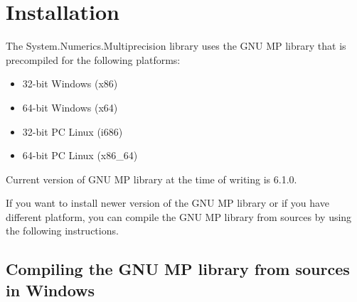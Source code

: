 \documentclass[a4paper,oneside,11.000000pt]{book}
\begin{document}
\chapter{Installation}

The System.Numerics.Multiprecision library uses the GNU MP library
that is precompiled for the following platforms:

\begin{itemize}
\item 32-bit Windows (x86)
\item 64-bit Windows (x64)
\item 32-bit PC Linux (i686)
\item 64-bit PC Linux (x86\_64)
\end{itemize}

Current version of GNU MP library at the time of writing is 6.1.0.

If you want to install newer version of the GNU MP library or
if you have different platform, you can compile the GNU MP library from sources
by using the following instructions.

\section{Compiling the GNU MP library from sources in Windows}
\end{document}
